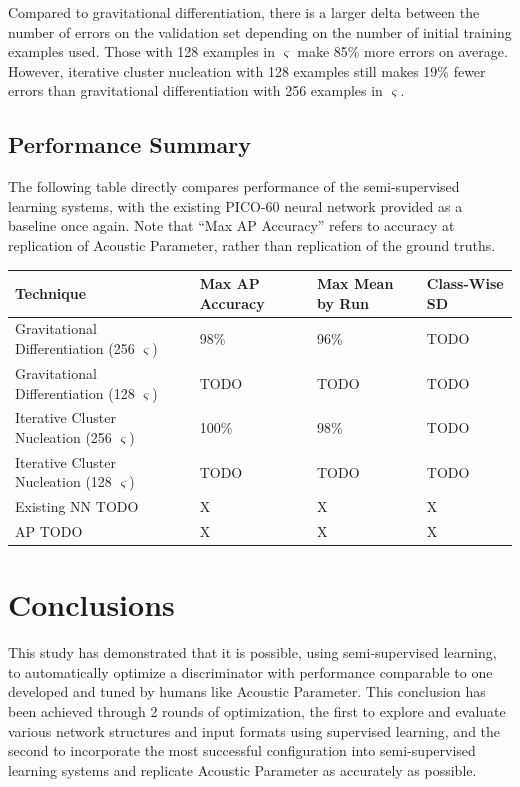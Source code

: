 \documentclass[10pt]{article}
\begin{document}
Compared to gravitational differentiation, there is a larger delta between the number of errors on the validation set depending on the number of initial training examples used. Those with 128 examples in $\varsigma$ make 85\% more errors on average. However, iterative cluster nucleation with 128 examples still makes 19\% fewer errors than gravitational differentiation with 256 examples in $\varsigma$.

\subsection{Performance Summary}

The following table directly compares performance of the semi-supervised learning systems, with the existing PICO-60 neural network provided as a baseline once again. Note that ``Max AP Accuracy'' refers to accuracy at replication of Acoustic Parameter, rather than replication of the ground truths.

\begin{tabular}{|l|l|l|l|}
    \hline
    Technique & Max AP Accuracy & Max Mean by Run & Class-Wise SD \\
    \hline
    Gravitational Differentiation (256 $\varsigma$) & 98\% & 96\% & TODO \\
    \hline
    Gravitational Differentiation (128 $\varsigma$) & TODO & TODO & TODO \\
    \hline
    Iterative Cluster Nucleation (256 $\varsigma$) & 100\% & 98\% & TODO \\
    \hline
    Iterative Cluster Nucleation (128 $\varsigma$) & TODO & TODO & TODO \\
    \hline
    Existing NN TODO & X & X & X \\
    \hline
    AP TODO & X & X & X \\
    \hline
\end{tabular}

\section{Conclusions}

This study has demonstrated that it is possible, using semi-supervised learning, to automatically optimize a discriminator with performance comparable to one developed and tuned by humans like Acoustic Parameter. This conclusion has been achieved through 2 rounds of optimization, the first to explore and evaluate various network structures and input formats using supervised learning, and the second to incorporate the most successful configuration into semi-supervised learning systems and replicate Acoustic Parameter as accurately as possible.
\end{document}
